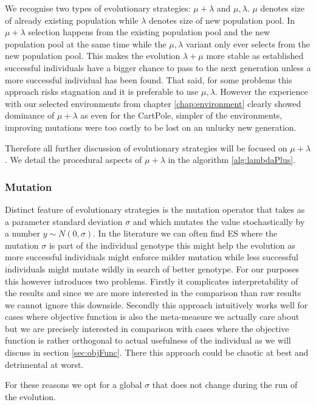 We recognise two types of evolutionary strategies: $ \mu + \lambda $ and $  \mu , \lambda$. $ \mu $ denotes size of already existing population while $\lambda$ denotes size of new population pool. In $  \mu + \lambda $ selection happens from the existing population pool and the new population pool at the same time while the $  \mu , \lambda  $ variant only ever selects from the new population pool. This makes the evolution $  \lambda + \mu $ more stable as established successful individuals have a bigger chance to pass to the next generation unless a more successful individual has been found. That said, for some problems this approach risks stagnation and it is preferable to use $ \mu, \lambda $. However the experience with our selected environments from chapter \ref{chap:environment} clearly showed dominance of $ \mu + \lambda $ as even for the CartPole, simpler of the environments, improving mutations were too costly to be lost on an unlucky new generation. 

Therefore all further discussion of evolutionary strategies will be focused on $  \mu + \lambda$. We detail the procedural aspects of $  \mu + \lambda$ in the algorithm \ref{alg:lambdaPlus}.
\subsubsection{Mutation}
Distinct feature of evolutionary strategies is the mutation operator that takes as a parameter standard deviation $ \sigma $ and which mutates the value stochastically by a number $ y \sim N(0, \sigma) $. In the literature we can often find ES where the mutation $ \sigma $ is part of the individual genotype this might help the evolution as more successful individuals might enforce milder mutation while less successful individuals might mutate wildly in search of better genotype.
For our purposes this however introduces two problems. Firstly it complicates interpretability of the results and since we are more interested in the comparison than raw results we cannot ignore this downside. Secondly this approach intuitively works well for cases where objective function is also the meta-measure we actually care about but we are precisely interested in comparison with cases where the objective function is rather orthogonal to actual usefulness of the individual as we will discuss in section \ref{sec:objFunc}. There this approach could be chaotic at best and detrimental at worst.

For these reasons we opt for a global $ \sigma $ that does not change during the run of the evolution.
